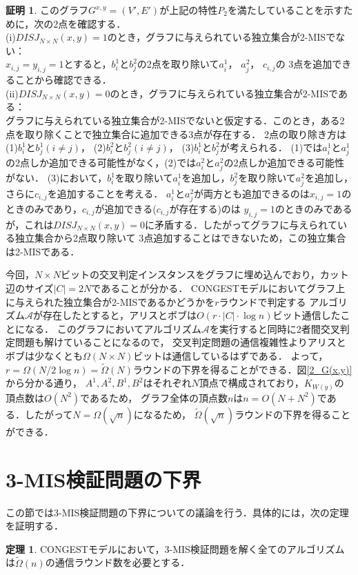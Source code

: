 \documentclass[12pt]{thesis}
\newcommand{\CONGEST}{\textsf{CONGEST}}
\theoremstyle{definition}
\newtheorem{theorem}{定理}[chapter]
\newtheorem*{prf*}{証明}
\begin{document}
\begin{prf*}
このグラフ$G^{x, y} = (V', E')$が上記の特性$P_{2}$を満たしていることを示すために，次の2点を確認する． \\
(i)$DISJ_{N \times N} (x, y) = 1$のとき，グラフに与えられている独立集合が2-MISでない： \\
$x_{i, j} = y_{i, j} =1$とすると，$b_{i}^{1}$と$b_{j}^{2}$の2点を取り除いて$a_{i}^{1}$， $a_{j}^{2}$， $c_{i, j}$の
3点を追加できることから確認できる． \\
(ii)$DISJ_{N \times N} (x, y) = 0$のとき，グラフに与えられている独立集合が2-MISである： \\ 
グラフに与えられている独立集合が2-MISでないと仮定する．このとき，ある2点を取り除くことで独立集合に追加できる3点が存在する．
2点の取り除き方は(1)$b_{i}^{1}$と$b_{j}^{1}(i \neq j)$， (2)$b_{i}^{2}$と$b_{j}^{2}(i \neq j)$， (3)$b_{i}^{1}$と$b_{j}^{2}$が考えられる．
(1)では$a_{i}^{1}$と$a_{j}^{1}$の2点しか追加できる可能性がなく，(2)では$a_{i}^{2}$と$a_{j}^{2}$の2点しか追加できる可能性がない．
(3)において，$b_{i}^{1}$を取り除いて$a_{i}^{1}$を追加し，$b_{j}^{2}$を取り除いて$a_{j}^{2}$を追加し，さらに$c_{i, j}$を追加することを考える．
$a_{i}^{1}$と$a_{j}^{2}$が両方とも追加できるのは$x_{i, j} = 1$のときのみであり，$c_{i, j}$が追加できる($c_{i, j}$が存在する)のは
$y_{i, j} = 1$のときのみであるが，これは$DISJ_{N \times N} (x, y) = 0$に矛盾する．したがってグラフに与えられている独立集合から2点取り除いて
3点追加することはできないため，この独立集合は2-MISである．

今回，$N \times N$ビットの交叉判定インスタンスをグラフに埋め込んでおり，カット辺のサイズ$|C| = 2N$であることが分かる．
{\CONGEST}モデルにおいてグラフ上に与えられた独立集合が2-MISであるかどうかを$r$ラウンドで判定する
アルゴリズム$\mathcal{A}$が存在したとすると，アリスとボブは$O(r \cdot |C| \cdot \log n)$ビット通信したことになる．
このグラフにおいてアルゴリズム$\mathcal{A}$を実行すると同時に2者間交叉判定問題も解けていることになるので，
交叉判定問題の通信複雑性よりアリスとボブは少なくとも$\Omega (N \times N)$ビットは通信しているはずである．
よって，$r = \Omega (N / 2\log n) = \tilde{\Omega}(N)$ラウンドの下界を得ることができる．図\ref{2_G(x,y)}から分かる通り，
$A^{1}, A^{2}, B^{1}, B^{2}$はそれぞれ$N$頂点で構成されており，$K_{W(y)}$の頂点数は$O(N^{2})$であるため，
グラフ全体の頂点数$n$は$n = O(N + N^{2})$である．したがって$N = \Omega(\sqrt{n})$になるため，
$\tilde{\Omega}(\sqrt{n})$ラウンドの下界を得ることができる．
\end{prf*}
\newpage

\section{3-MIS検証問題の下界}
この節では3-MIS検証問題の下界についての議論を行う．具体的には，次の定理を証明する．
\begin{theorem}
{\CONGEST}モデルにおいて，3-MIS検証問題を解く全てのアルゴリズムは$\tilde{\Omega} (n)$の通信ラウンド数を必要とする．
\end{theorem}
\end{document}
